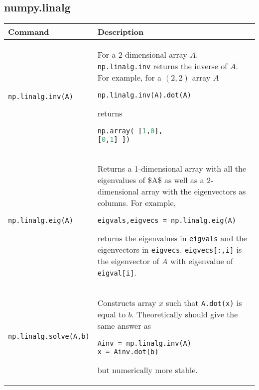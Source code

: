 \subsection{numpy.linalg}\label{numpy.linalg}

\begin{tabular}[]{@{}ll@{}}
\toprule
\begin{minipage}[b]{0.19\columnwidth}\raggedright\strut
Command\strut
\end{minipage} & \begin{minipage}[b]{0.75\columnwidth}\raggedright\strut
Description\strut
\end{minipage}\tabularnewline
\midrule
\begin{minipage}[t]{0.19\columnwidth}\raggedright\strut
\lstinline!np.linalg.inv(A)!\strut
\end{minipage} & \begin{minipage}[t]{0.75\columnwidth}\raggedright\strut
For a 2-dimensional array \(A\). \lstinline!np.linalg.inv! returns the
inverse of \(A\). For example, for a \((2,2)\) array \(A\)

\begin{lstlisting}[language=Python]
np.linalg.inv(A).dot(A)
\end{lstlisting}

returns

\begin{lstlisting}[language=Python]
np.array( [1,0],
[0,1] ])
\end{lstlisting}
\strut
\end{minipage}\tabularnewline
\begin{minipage}[t]{0.19\columnwidth}\raggedright\strut
\lstinline!np.linalg.eig(A)!\strut
\end{minipage} & \begin{minipage}[t]{0.75\columnwidth}\raggedright\strut
Returns a 1-dimensional array with all the eigenvalues of \$A\$ as well
as a 2-dimensional array with the eigenvectors as columns. For example,

\lstinline!eigvals,eigvecs = np.linalg.eig(A)!

returns the eigenvalues in \lstinline!eigvals! and the eigenvectors in
\lstinline!eigvecs!. \lstinline!eigvecs[:,i]! is the eigenvector of
\(A\) with eigenvalue of \lstinline!eigval[i]!.\strut
\end{minipage}\tabularnewline
\begin{minipage}[t]{0.19\columnwidth}\raggedright\strut
\lstinline!np.linalg.solve(A,b)!\strut
\end{minipage} & \begin{minipage}[t]{0.75\columnwidth}\raggedright\strut
Constructs array \(x\) such that \lstinline!A.dot(x)! is equal to \(b\).
Theoretically should give the same answer as

\begin{lstlisting}[language=Python]
Ainv = np.linalg.inv(A)
x = Ainv.dot(b)
\end{lstlisting}

but numerically more stable.\strut
\end{minipage}\tabularnewline
\bottomrule
\end{tabular}

